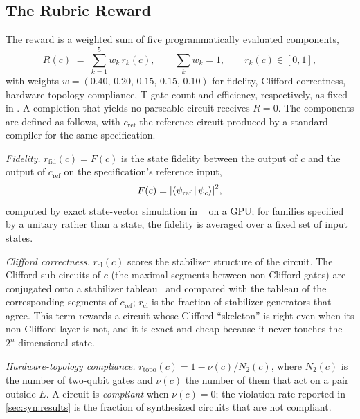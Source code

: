 \subsection{The Rubric Reward}\label{sec:syn:rubric}

The reward is a weighted sum of five programmatically evaluated components,
\begin{equation}\label{eq:syn:rubric}
  R(c) \;=\; \sum_{k=1}^{5} w_k\, r_k(c),\qquad \sum_k w_k = 1,\qquad r_k(c)\in[0,1],
\end{equation}
with weights $w=(0.40,\,0.20,\,0.15,\,0.15,\,0.10)$ for fidelity, Clifford correctness, hardware-topology compliance, T-gate count and efficiency, respectively, as fixed in \cite{guo2026rubriq}. A completion that yields no parseable circuit receives $R=0$. The components are defined as follows, with $c_{\mathrm{ref}}$ the reference circuit produced by a standard compiler for the same specification.

\emph{Fidelity.} $r_{\mathrm{fid}}(c)=F(c)$ is the state fidelity between the output of $c$ and the output of $c_{\mathrm{ref}}$ on the specification's reference input,
\begin{equation}\label{eq:syn:fid}
  F(c)=\abs{\langle \psi_{\mathrm{ref}}\,|\,\psi_{c}\rangle}^{2},
\end{equation}
computed by exact state-vector simulation in \cudaq{}~\cite{kim2023cudaquantum} on a GPU; for families specified by a unitary rather than a state, the fidelity is averaged over a fixed set of input states.

\emph{Clifford correctness.} $r_{\mathrm{cl}}(c)$ scores the stabilizer structure of the circuit. The Clifford sub-circuits of $c$ (the maximal segments between non-Clifford gates) are conjugated onto a stabilizer tableau~\cite{aaronson2004stabilizer} and compared with the tableau of the corresponding segments of $c_{\mathrm{ref}}$; $r_{\mathrm{cl}}$ is the fraction of stabilizer generators that agree. This term rewards a circuit whose Clifford ``skeleton'' is right even when its non-Clifford layer is not, and it is exact and cheap because it never touches the $2^n$-dimensional state.

\emph{Hardware-topology compliance.} $r_{\mathrm{topo}}(c)=1-\nu(c)/N_2(c)$, where $N_2(c)$ is the number of two-qubit gates and $\nu(c)$ the number of them that act on a pair outside $E$. A circuit is \emph{compliant} when $\nu(c)=0$; the violation rate reported in \cref{sec:syn:results} is the fraction of synthesized circuits that are not compliant.

